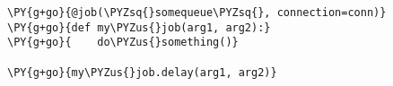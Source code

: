 \begin{Verbatim}[commandchars=\\\{\}]
\PY{g+go}{@job(\PYZsq{}somequeue\PYZsq{}, connection=conn)}
\PY{g+go}{def my\PYZus{}job(arg1, arg2):}
\PY{g+go}{    do\PYZus{}something()}

\PY{g+go}{my\PYZus{}job.delay(arg1, arg2)}
\end{Verbatim}
